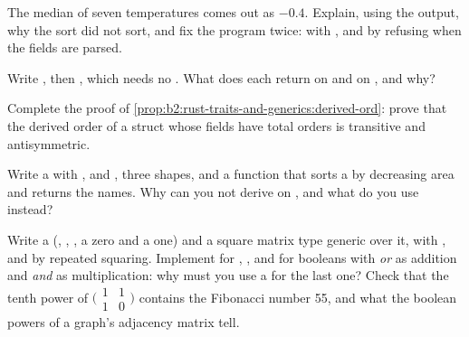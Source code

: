 \begin{exercise}[$\star\star$]\label{exo:b2:rust-traits-and-generics:6}
The median of seven temperatures comes out as $-0.4$. Explain, using the output, why the sort did not sort, and fix
the program twice: with , and by refusing  when the fields are parsed.
\end{exercise}

\begin{exercise}[$\star\star$]\label{exo:b2:rust-traits-and-generics:7}
Write , then , which needs no
. What does each return on \code{[1.0, NaN, 3.0]} and on \code{[NaN, 3.0]}, and why?
\end{exercise}

\begin{exercise}[$\star\star$]\label{exo:b2:rust-traits-and-generics:8}
Complete the proof of \cref{prop:b2:rust-traits-and-generics:derived-ord}: prove that the derived order of a struct
whose fields have total orders is transitive and antisymmetric.
\end{exercise}

\begin{exercise}[$\star\star$]\label{exo:b2:rust-traits-and-generics:9}
Write a   with ,  and , three shapes, and a function that
sorts a  by decreasing area and returns the names. Why can you not derive  on
, and what do you use instead?
\end{exercise}

\begin{exercise}[$\star\star\star$]\label{exo:b2:rust-traits-and-generics:10}
Write a   (, \code{+}, \code{*}, a zero and a one) and a square matrix type
generic over it, with ,  and  by repeated squaring. Implement  for
, , and for booleans with \emph{or} as addition and \emph{and} as multiplication: why must you
use a  for the last one? Check that the tenth power of $\bigl(\begin{smallmatrix}1&1\\1&0\end{smallmatrix}
\bigr)$ contains the Fibonacci number 55, and what the boolean powers of a graph's adjacency matrix tell.
\end{exercise}

